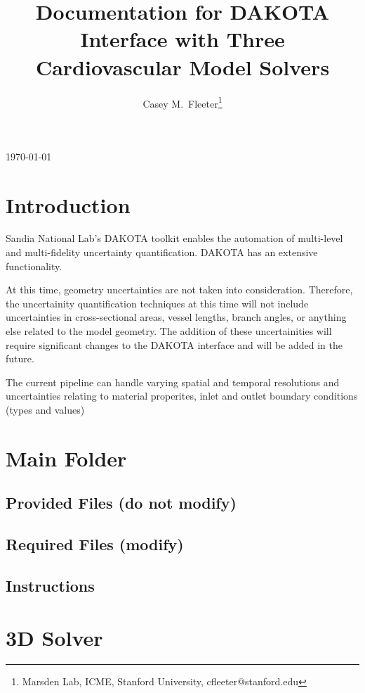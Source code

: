 \documentclass{UQDoc}
\title{Documentation for DAKOTA Interface with Three Cardiovascular Model Solvers}
\author{Casey M.\ Fleeter\thanks{Marsden Lab, ICME, Stanford University, cfleeter@stanford.edu}}
\begin{document}
\maketitle
\noindent\today \\


\tableofcontents


\section{Introduction} \label{CMF:sec:intro}
Sandia National Lab's DAKOTA toolkit enables the automation of multi-level and multi-fidelity uncertainty quantification. DAKOTA has an extensive functionality.

At this time, geometry uncertainties are not taken into consideration. Therefore, the uncertainity quantification techniques at this time will not include uncertainties in cross-sectional areas, vessel lengths, branch angles, or anything else related to the model geometry. The addition of these uncertainities will require significant changes to the DAKOTA interface and will be added in the future.

The current pipeline can handle varying spatial and temporal resolutions and uncertainties relating to material properites, inlet and outlet boundary conditions (types and values)

\section{Main Folder} \label{CMF:sec:Main}
\subsection{Provided Files (do not modify)}

\subsection{Required Files (modify)}

\subsection{Instructions}


\section{3D Solver} \label{CMF:sec:3D}
\end{document}

